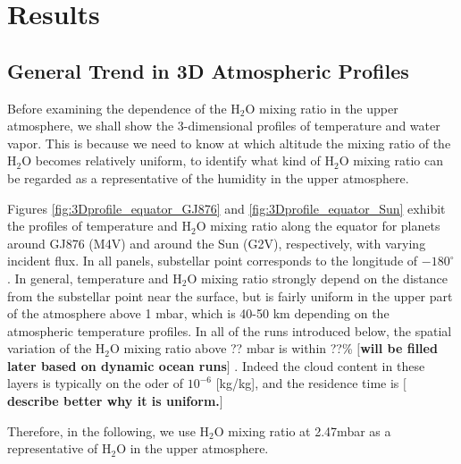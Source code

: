 \documentclass[11pt,numberedappendix,twocolappendix,]{emulateapj}
\def\water{H$_2$O }
\def\preslevel{2.47}
\def\memo#1{\color{red}$[${\bf #1}$]$ \color{black}}
\begin{document}
\section{Results}
\label{s:results}

\subsection{General Trend in 3D Atmospheric Profiles}
\label{ss:result_H2Omixingratio}

Before examining the dependence of the \water mixing ratio in the upper atmosphere, we shall show the 3-dimensional profiles of temperature and water vapor. 
This is because we need to know at which altitude the mixing ratio of the \water becomes relatively uniform, to identify what kind of \water mixing ratio can be regarded as a representative of the humidity in the upper atmosphere. 

Figures \ref{fig:3Dprofile_equator_GJ876} and \ref{fig:3Dprofile_equator_Sun} exhibit the profiles of temperature and \water mixing ratio along the equator for planets around GJ876 (M4V) and around the Sun (G2V), respectively, with varying incident flux. 
In all panels, substellar point corresponds to the longitude of $-180^{\circ }$. 
In general, temperature and \water mixing ratio strongly depend on the distance from the substellar point near the surface, but is fairly uniform in the upper part of the atmosphere above 1 mbar, which is 40-50 km depending on the atmospheric temperature profiles. 
In all of the runs introduced below, the spatial variation of the \water mixing ratio above ?? mbar is within ??\% \memo{will be filled later based on dynamic ocean runs}. 
Indeed the cloud content in these layers is typically on the oder of $10^{-6} $ [kg/kg], and the residence time is \memo{describe better why it is uniform.}

Therefore, in the following, we use \water mixing ratio at \preslevel mbar as a representative of \water in the upper atmosphere. 
\end{document}
